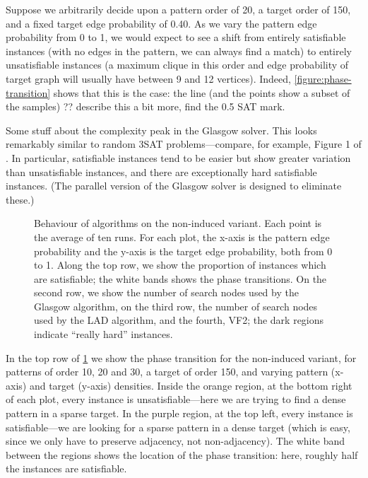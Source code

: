 \documentclass[letterpaper]{article}
\begin{document}
Suppose we arbitrarily decide upon a pattern order of 20, a target order of 150, and a fixed target
edge probability of 0.40. As we vary the pattern edge probability from 0 to 1, we would expect to see a shift from
entirely satisfiable instances (with no edges in the pattern, we can always find a match) to
entirely unsatisfiable instances (a maximum clique in this order and edge probability of target graph will
usually have between 9 and 12 vertices). Indeed, \cref{figure:phase-transition} shows that this is
the case: the line (and the points show a subset of the samples) ?? describe this a bit more, find
the 0.5 SAT mark.

Some stuff about the complexity peak in the Glasgow solver. This looks remarkably similar to random
3SAT problems---compare, for example, Figure 1 of \citet{LeytonBrown:2014}. In particular,
satisfiable instances tend to be easier but show greater variation than unsatisfiable instances, and
there are exceptionally hard satisfiable instances. (The parallel version of the Glasgow solver is
designed to eliminate these.)

\begin{figure}[tb]
    
    \caption{Behaviour of algorithms on the non-induced variant. Each point is the average of ten
        runs. For each plot, the x-axis is the pattern edge probability and the y-axis is the target
        edge probability, both from 0 to 1. Along the top row, we show the proportion of instances which are
        satisfiable; the white bands shows the phase transitions. On the second row, we show the
        number of search nodes used by the Glasgow algorithm, on the third row, the number of
        search nodes used by the LAD algorithm, and the fourth, VF2; the dark regions indicate
        ``really hard'' instances.}
    \label{figure:non-induced}
\end{figure}

In the top row of \cref{figure:non-induced} we show the phase transition for the non-induced
variant, for patterns of order 10, 20 and 30, a target of order 150, and varying pattern (x-axis)
and target (y-axis) densities. Inside the orange region, at the bottom right of each plot, every
instance is unsatisfiable---here we are trying to find a dense pattern in a sparse target. In the
purple region, at the top left, every instance is satisfiable---we are looking for a sparse pattern
in a dense target (which is easy, since we only have to preserve adjacency, not non-adjacency). The
white band between the regions shows the location of the phase transition: here, roughly half the
instances are satisfiable.
\end{document}

